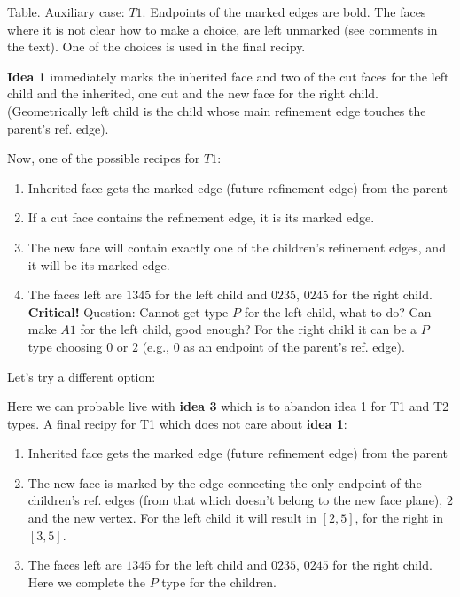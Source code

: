 \documentclass[a4paper,12pt]{amsart}
\numberwithin{equation}{section}
\begin{document}
\begin{itemize}
\begin{minipage}[]{0.5\textwidth}
\begin{center}
  \end{center}
\end{minipage}    

\begin{center}
	Table. Auxiliary case: $T1$. Endpoints of the marked edges are bold. The faces where it is not clear how to make a choice, are left unmarked (see comments in the text). One of the choices is used in the final recipy.
\end{center}
    
    \textbf{Idea 1} immediately marks the inherited face and two of the cut faces for the left child and the inherited, one cut and the new face for the right child. (Geometrically left child is the child whose main refinement edge touches the parent's ref. edge).
    
    Now, one of the possible recipes for $T1$:
    	\begin{enumerate}
		\item Inherited face gets the marked edge (future refinement edge) from the parent
		\item If a cut face contains the refinement edge, it is its marked edge.
		\item The new face will contain exactly one of the children's refinement edges, and it will be its marked edge.
		\item The faces left are $1345$ for the left child and $0235$, $0245$ for the right child. 
		\textbf{Critical!} Question: Cannot get type $P$ for the left child, what to do? Can make $A1$ for the left child, good enough? For the right child it can be a $P$ type choosing $0$ or $2$ (e.g., $0$ as an endpoint of the parent's ref. edge).
	\end{enumerate}
	Let's try a different option:
		
		Here we can probable live with \textbf{idea 3} which is to abandon idea 1 for T1 and T2 types.
		A final recipy for T1 which does not care about \textbf{idea 1}:
    	\begin{enumerate}
		\item Inherited face gets the marked edge (future refinement edge) from the parent
		\item The new face is marked by the edge connecting the only endpoint of the children's ref. edges (from that which doesn't belong to the new face plane), $2$ and the new vertex. For the left child it will result in $[2,5]$, for the right in $[3,5]$.
		\item The faces left are $1345$ for the left child and $0235$, $0245$ for the right child. Here we complete the $P$ type for the children.
	\end{enumerate}
	

\end{itemize}
\end{document}
